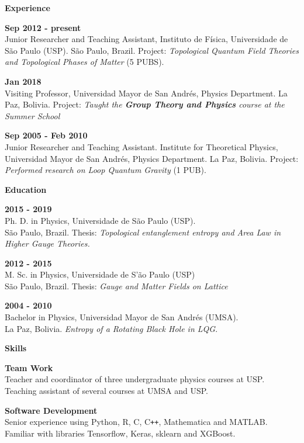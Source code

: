 \documentclass[a4paper,12pt,final]{memoir}
\newcommand{\Sep}{\vspace{1.5em}}
\newcommand{\SmallSep}{\vspace{0.5em}}
\newcommand{\CVSection}[1]
	{\Large\textbf{#1}\par
	\SmallSep\normalsize\normalfont}
\newcommand{\CVItem}[1]
	{\textbf{\color{RoyalBlue} #1}}
\begin{document}
\CVSection{Experience}
\CVItem{Sep 2012 - present}\\
Junior Researcher and Teaching Assistant,  Instituto de F\'{i}sica, Universidade de S\~{a}o Paulo 
(USP). S\~{a}o Paulo, Brazil. Project: \emph{Topological Quantum Field Theories and Topological Phases of Matter} (5 PUBS).
\SmallSep


\CVItem{Jan 2018}\\
Visiting Professor, Universidad Mayor de San Andr\'{e}s, Physics Department. La Paz, Bolivia. Project: \emph{Taught the \textbf{Group Theory and Physics} course at the Summer School}
\SmallSep

\CVItem{Sep 2005 - Feb 2010}\\
Junior Researcher and Teaching Assistant. Institute for Theoretical Physics,
Universidad Mayor de San Andr\'{e}s, Physics Department. La Paz, Bolivia. Project: \emph{Performed research on Loop Quantum Gravity} (1 PUB).

\Sep

\CVSection{Education}
\CVItem{2015 - 2019}\\
Ph. D. in Physics, Universidade de S\~{a}o Paulo (USP).\\ 
S\~{a}o Paulo, Brazil. Thesis:  \emph{Topological entanglement entropy and Area Law in Higher Gauge Theories.} 
\SmallSep

\CVItem{2012 - 2015}\\
M. Sc. in Physics, Universidade de S'\~{a}o Paulo (USP)\\
S\~{a}o Paulo, Brazil. Thesis: \emph{Gauge and Matter Fields on Lattice}
\SmallSep

\CVItem{2004 - 2010}\\
Bachelor in Physics, Universidad Mayor de San Andr\'{e}s (UMSA).\\
La Paz, Bolivia. \emph{Entropy of a Rotating Black Hole in LQG}.

\Sep

\CVSection{Skills}


\CVItem{Team Work}\\
Teacher and coordinator of three undergraduate physics courses at USP.\\
Teaching assistant of several courses at UMSA and USP.
\SmallSep

\CVItem{Software Development}\\
Senior experience using Python, R, C, C\texttt{++}, Mathematica and MATLAB.\\
Familiar with libraries Tensorflow, Keras, sklearn and XGBoost. 




\end{document}
